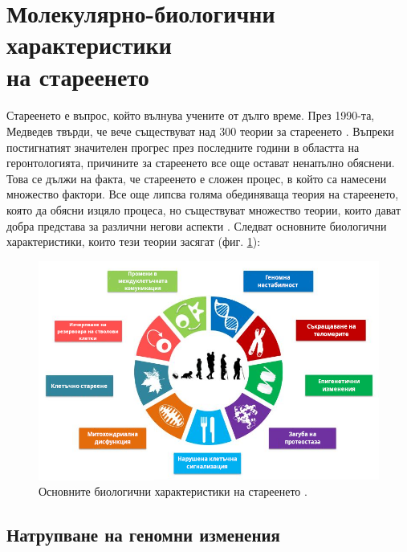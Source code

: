 \documentclass[pdftex,cyrillic,14pt,a4page,twoside,openright]{extreport}
\begin{document}
\section[Молекулярно-биологични характеристики на стареенето]{Молекулярно-биологични характеристики\\ на стареенето}
\paragraph{}
Стареенето е въпрос, който вълнува учените от дълго време. През 1990-та, Медведев твърди, че вече съществуват над 300 теории за стареенето \cite{medvedev1990}. Въпреки постигнатият значителен прогрес през последните години в областта на геронтологията, причините за стареенето все още остават ненапълно обяснени. Това се дължи на факта, че стареенето е сложен процес, в който са намесени множество фактори. Все още липсва голяма обединяваща теория на стареенето, която да обясни изцяло процеса, но съществуват множество теории, които дават добра представа за различни негови аспекти \cite{vina2007}. Следват основните биологични характеристики, които тези теории засягат (фиг. \ref{fig:biological_characteristics_of_aging}):

\begin{figure}[htp]
  \centering
  \includegraphics[width=14.1cm]{figures/biological_characteristics_of_aging}
  \caption {Основните биологични характеристики на стареенето \cite{lopezotin2013}.}
  \label{fig:biological_characteristics_of_aging}
\end{figure}

\subsection{Натрупване на геномни изменения}
\end{document}

